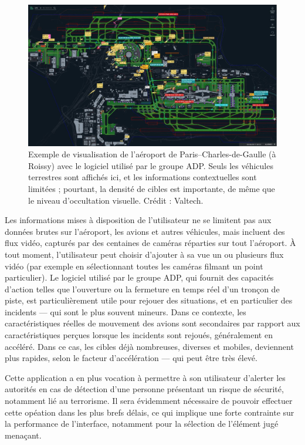 	\begin{figure}[H]
		\centering
		\includegraphics[width=\textwidth]{figures/ch1/adp}
		\caption[ADP -- Roissy.]{Exemple de visualisation de l'aéroport de Paris--Charles-de-Gaulle (à Roissy) avec le logiciel utilisé par le groupe ADP. Seuls les véhicules terrestres sont affichés ici, et les informations contextuelles sont limitées ; pourtant, la densité de cibles est importante, de même que le niveau d'occultation visuelle. Crédit : Valtech.}
		\label{fig:adp}
	\end{figure}
	
	Les informations mises à disposition de l'utilisateur ne se limitent pas aux données brutes sur l'aéroport, les avions et autres véhicules, mais incluent des flux vidéo, capturés par des centaines de caméras réparties sur tout l'aéroport. À tout moment, l'utilisateur peut choisir d'ajouter à sa vue un ou plusieurs flux vidéo (par exemple en sélectionnant toutes les caméras filmant un point particulier). Le logiciel utilisé par le groupe ADP, qui fournit des capacités d'action telles que l'ouverture ou la fermeture en temps réel d'un tronçon de piste, est particulièrement utile pour rejouer des situations, et en particulier des incidents --- qui sont le plus souvent mineurs. Dans ce contexte, les caractéristiques réelles de mouvement des avions sont secondaires par rapport aux caractéristiques perçues lorsque les incidents sont rejoués, généralement en accéléré. Dans ce cas, les cibles déjà nombreuses, diverses et mobiles, deviennent plus rapides, selon le facteur d'accélération --- qui peut être très élevé.
	
	Cette application a en plus vocation à permettre à son utilisateur d'alerter les autorités en cas de détection d'une personne présentant un risque de sécurité, notamment lié au terrorisme. Il sera évidemment nécessaire de pouvoir effectuer cette opéation dans les plus brefs délais, ce qui implique une forte contrainte sur la performance de l'interface, notamment pour la sélection de l'élément jugé menaçant.
	
